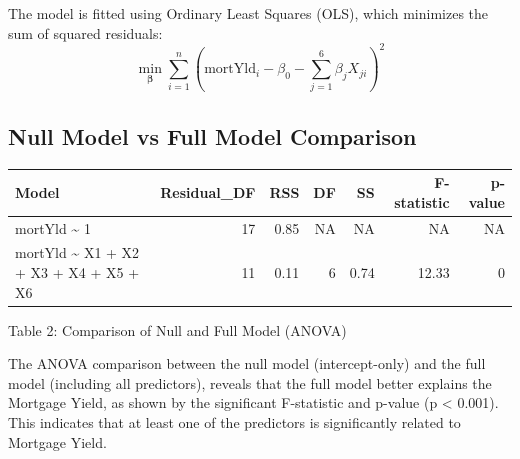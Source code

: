 \documentclass[
  12pt,
]{article}
\begin{document}
\vspace{0.2cm}

The model is fitted using Ordinary Least Squares (OLS), which minimizes
the sum of squared residuals:\\
\vspace{-0.2cm} \[
\min_{\boldsymbol\beta} \sum_{i=1}^n \left( \text{mortYld}_i - \beta_0 - \sum_{j=1}^6 \beta_j X_{ji} \right)^2
\] \vspace{-0.3cm}

\subsection{Null Model vs Full Model
Comparison}\label{null-model-vs-full-model-comparison}

\begin{table}[!h]
\centering\begingroup\fontsize{8}{10}\selectfont

\begin{tabular}{lrrrrrr}
\toprule
Model & Residual\_DF & RSS & DF & SS & F-statistic & p-value\\
\midrule
mortYld \textasciitilde{} 1 & 17 & 0.85 & NA & NA & NA & NA\\
mortYld \textasciitilde{} X1 + X2 + X3 + X4 + X5 + X6 & 11 & 0.11 & 6 & 0.74 & 12.33 & 0\\
\bottomrule
\end{tabular}
\endgroup{}
\end{table}
\begin{center}
\vspace{-1.6em}
{\fontsize{12}{14}\selectfont Table 2: Comparison of Null and Full Model (ANOVA)\par}
\end{center}

\vspace{-0.5cm}

The ANOVA comparison between the null model (intercept-only) and the
full model (including all predictors), reveals that the full model
better explains the Mortgage Yield, as shown by the significant
F-statistic and p-value (p \textless{} 0.001). This indicates that at
least one of the predictors is significantly related to Mortgage Yield.
\end{document}
